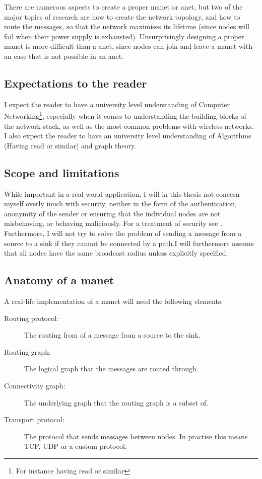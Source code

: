 There are numerous aspects to create a proper \ac{manet} or \ac{anet}, but two of the major topics of research are how to create the network topology, and how to route the messages, so that the network maximises its lifetime (since nodes will fail when their power supply is exhausted). Unsurprisingly designing a proper \ac{manet} is more difficult than a \ac{anet}, since nodes can join and leave a \ac{manet} with an ease that is not possible in an \ac{anet}. 

\subsection{Expectations to the reader}
I expect the reader to have a university level understanding of Computer Networking\footnote{For instance having read \cite{ComNet} or similar}, especially when it comes to understanding the building blocks of the network stack, as well as the most common problems with wireless networks. I also expect the reader to have an university level understanding of Algorithms (Having read \cite{algo} or similar) and graph theory.

\subsection{Scope and limitations}
While important in a real world application, I will in this thesis not concern myself overly much with security, neither in the form of the authentication, anonymity of the sender or ensuring that the individual nodes are not misbehaving, or behaving maliciously. For a treatment of security see \cite{trustedRouting}. Furthermore, I will not try to solve the problem of sending a message from a source to a sink if they cannot be connected by a path.I will furthermore assume that all nodes have the same broadcast radius unless explicitly specified.

\subsection{Anatomy of a \ac{manet}}
A real-life implementation of a \ac{manet} will need the following elements:
\begin{description}
\item[Routing protocol:] The routing from of a message from a source to the sink.
\item[Routing graph:] The logical graph that the messages are routed through.
\item[Connectivity graph:] The underlying graph that the routing graph is a subset of.
\item[Transport protocol:] The protocol that sends messages between nodes. In practise this means TCP, UDP or a custom protocol.
\end{description}


